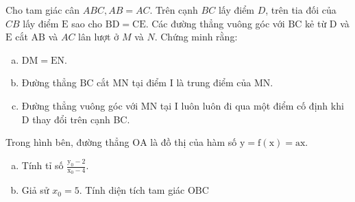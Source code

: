 \begin{bt}
    Cho tam giác cân $A B C, A B=A C$. Trên cạnh $B C$ lấy điểm $D$, trên tia đối của $C B$ lấy điểm $\mathrm{E}$ sao cho $\mathrm{BD}=\mathrm{CE}$. Các đường thẳng vuông góc với $\mathrm{BC}$ kẻ từ $\mathrm{D}$ và $\mathrm{E}$ cắt $\mathrm{AB}$ và $A C$ lân lượt ở $M$ và $N$. Chứng minh rằng: 
    \begin{enumerate}[a.]
    \item $\mathrm{DM}=\mathrm{EN}$.
    \item Đường thẳng $\mathrm{BC}$ cắt $\mathrm{MN}$ tại điểm $\mathrm{I}$ là trung điểm của $\mathrm{MN}$.
    \item Đường thẳng vuông góc với $\mathrm{MN}$ tại I luôn luôn đi qua một điểm cố định khi $\mathrm{D}$ thay đổi trên cạnh BC.
    \end{enumerate}
\loigiai{}
\end{bt}

\begin{bt}
    \hfill
    Trong hình bên, đường thẳng $\mathrm{OA}$ là đồ thị của hàm số $\mathrm{y}=\mathrm{f}(\mathrm{x})=\mathrm{ax}$.
    \begin{enumerate}[a.]
        \item  Tính tỉ số $\frac{\mathrm{y}_0-2}{\mathrm{x}_0-4}$.
        \item Giả sử $x_0=5$. Tính diện tích tam giác $\mathrm{OBC}$
    \end{enumerate}
\loigiai{}
\end{bt}